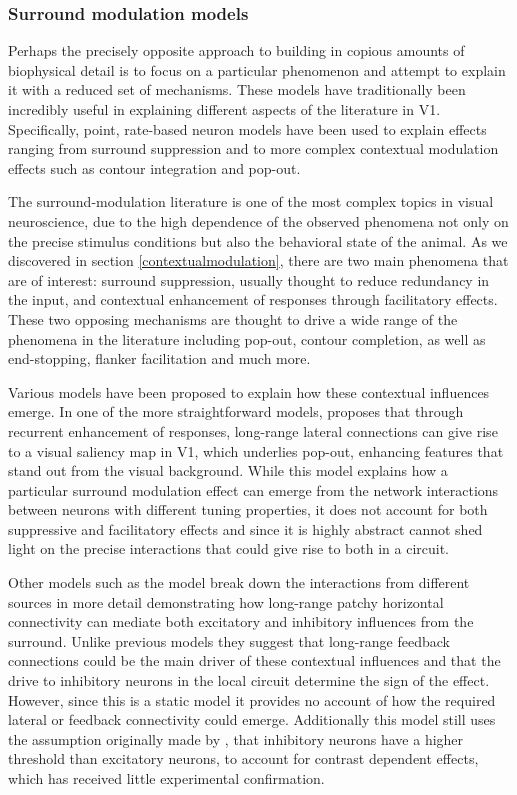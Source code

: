 \subsubsection{Surround modulation models} \label{SRmodels}

Perhaps the precisely opposite approach to building in copious amounts
of biophysical detail is to focus on a particular phenomenon and
attempt to explain it with a reduced set of mechanisms. These models
have traditionally been incredibly useful in explaining different
aspects of the literature in V1. Specifically, point, rate-based
neuron models have been used to explain effects ranging from surround
suppression and to more complex contextual modulation effects such as
contour integration and pop-out.

The surround-modulation literature is one of the most complex topics
in visual neuroscience, due to the high dependence of the observed
phenomena not only on the precise stimulus conditions but also the
behavioral state of the animal. As we discovered in section
\ref{contextualmodulation}, there are two main phenomena that are of
interest: surround suppression, usually thought to reduce redundancy
in the input, and contextual enhancement of responses through
facilitatory effects. These two opposing mechanisms are thought to
drive a wide range of the phenomena in the literature including
pop-out, contour completion, as well as end-stopping, flanker
facilitation and much more.

Various models have been proposed to explain how these contextual
influences emerge. In one of the more straightforward models,
\cite{Li2002} proposes that through recurrent enhancement of
responses, long-range lateral connections can give rise to a visual
saliency map in V1, which underlies pop-out, enhancing features that
stand out from the visual background. While this model explains how a
particular surround modulation effect can emerge from the network
interactions between neurons with different tuning properties, it does
not account for both suppressive and facilitatory effects and since it
is highly abstract cannot shed light on the precise interactions that
could give rise to both in a circuit.

Other models such as the \cite{Schwabe2006} model break down the
interactions from different sources in more detail demonstrating how
long-range patchy horizontal connectivity can mediate both excitatory
and inhibitory influences from the surround. Unlike previous models
they suggest that long-range feedback connections could be the main
driver of these contextual influences and that the drive to inhibitory
neurons in the local circuit determine the sign of the
effect. However, since this is a static model it provides no account
of how the required lateral or feedback connectivity could
emerge. Additionally this model still uses the assumption originally
made by \cite{Somers1998}, that inhibitory neurons have a higher
threshold than excitatory neurons, to account for contrast dependent
effects, which has received little experimental confirmation.

